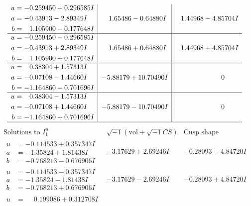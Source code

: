 \documentclass[1p]{elsarticle_modified}
\theoremstyle{definition}
\newcommand{\I}{\sqrt{-1}}
\begin{document}
$$\begin{array}{c|c|c}
\begin{aligned}
u &= -0.259450 + 0.296585 I \\
a &= -0.43913 - 2.89349 I \\
b &= \phantom{-}1.105900 - 0.177648 I\end{aligned}
 & \phantom{-}1.65486 - 0.64880 I & \phantom{-}1.44968 - 4.85704 I \\ \hline\begin{aligned}
u &= -0.259450 - 0.296585 I \\
a &= -0.43913 + 2.89349 I \\
b &= \phantom{-}1.105900 + 0.177648 I\end{aligned}
 & \phantom{-}1.65486 + 0.64880 I & \phantom{-}1.44968 + 4.85704 I \\ \hline\begin{aligned}
u &= \phantom{-}0.38304 + 1.57313 I \\
a &= -0.07108 - 1.44660 I \\
b &= -1.164860 - 0.701696 I\end{aligned}
 & -5.88179 + 10.70490 I & \phantom{-0.000000 } 0 \\ \hline\begin{aligned}
u &= \phantom{-}0.38304 - 1.57313 I \\
a &= -0.07108 + 1.44660 I \\
b &= -1.164860 + 0.701696 I\end{aligned}
 & -5.88179 - 10.70490 I & \phantom{-0.000000 } 0\\
 \hline 
 \end{array}$$\newpage$$\begin{array}{c|c|c}  
\text{Solutions to }I^u_{1}& \I (\text{vol} + \sqrt{-1}CS) & \text{Cusp shape}\\
 \hline 
\begin{aligned}
u &= -0.114533 + 0.357347 I \\
a &= -1.35824 + 1.81438 I \\
b &= -0.768213 - 0.676906 I\end{aligned}
 & -3.17629 + 2.69246 I & -0.28093 - 4.84720 I \\ \hline\begin{aligned}
u &= -0.114533 - 0.357347 I \\
a &= -1.35824 - 1.81438 I \\
b &= -0.768213 + 0.676906 I\end{aligned}
 & -3.17629 - 2.69246 I & -0.28093 + 4.84720 I \\ \hline\begin{aligned}
u &= \phantom{-}0.199086 + 0.312708 I \\

\end{aligned}
\end{array}$$
\end{document}

